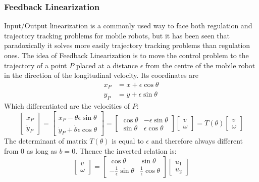 \subsubsection{Feedback Linearization}
Input/Output linearization is a commonly used way to face both regulation and trajectory tracking problems for mobile robots, but it has been seen that paradoxically it solves more easily trajectory tracking problems than regulation ones.
The idea of Feedback Linearization is to move the control problem to the trajectory of a point $P$ placed at a distance $\epsilon$ from the centre of the mobile robot in the direction of the longitudinal velocity.
Its coordinates are
\begin{equation}
	\begin{split}
		x_P&=x+\epsilon\cos\theta\\
		y_P&=y+\epsilon\sin\theta
	\end{split}
\end{equation}
Which differentiated are the velocities of $P$:
\begin{equation}
	\left[\begin{matrix}
		\dot{x}_P\\\dot{y}_P
	\end{matrix}\right]=\left[\begin{matrix}
		\dot{x}_P-\dot{\theta}\epsilon\sin\theta\\
		\dot{y}_P+\dot{\theta}\epsilon\cos\theta
	\end{matrix}\right]=\left[\begin{matrix}
	\cos\theta & -\epsilon\sin\theta\\
	\sin\theta & \epsilon\cos\theta
	\end{matrix}\right]\left[\begin{matrix}
	v\\\omega\end{matrix}\right]=T(\theta)\left[\begin{matrix}
	v\\\omega\end{matrix}\right]
\end{equation}
The determinant of matrix $T(\theta)$ is equal to $\epsilon$ and therefore always different from $0$ as long as $b=0$. Thence the inverted relation is:
\begin{equation} 
	\left[\begin{matrix}
		v\\\omega\end{matrix}\right]
	=\left[\begin{matrix}
		\cos\theta & \sin\theta\\
			-\frac{1}{\epsilon}\sin\theta & \frac{1}{\epsilon}\cos\theta
	\end{matrix}\right]\left[\begin{matrix}
		u_1\\u_2
	\end{matrix}\right] 
\end{equation}
